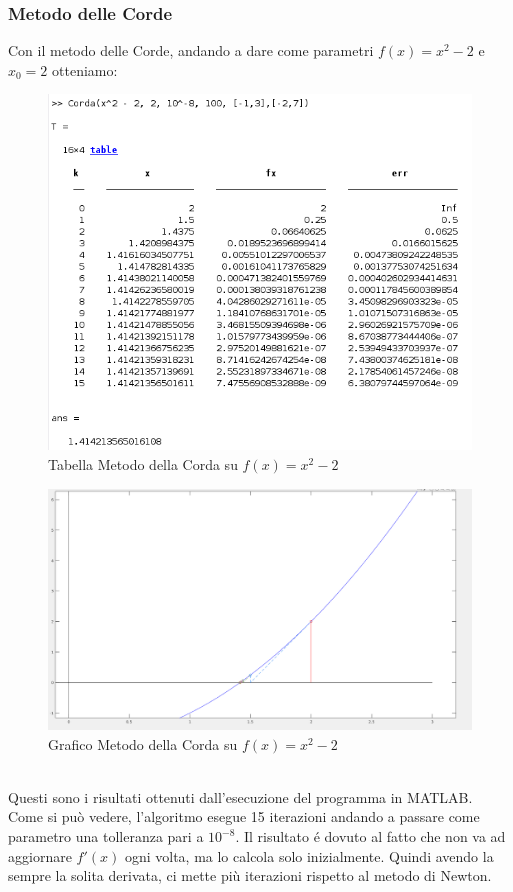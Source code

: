 \documentclass[12pt, letterpaper]{article}
\begin{document}
\subsubsection{Metodo delle Corde}
Con il metodo delle Corde, andando a dare come parametri $f(x)=x^2-2$ e $x_0=2$ otteniamo:
\begin{figure}[ht!]
    \includegraphics[scale=0.63]{TabellaParabolaCorda.png}
    \caption{Tabella Metodo della Corda su $f(x)=x^2-2$}
\end{figure}
\begin{figure}[ht!]
    \includegraphics[scale=0.5]{ParabolaChord.png}
    \caption{Grafico Metodo della Corda su $f(x)=x^2-2$}
\end{figure} \\

Questi sono i risultati ottenuti dall'esecuzione del programma in MATLAB.\\ Come si può vedere, l'algoritmo esegue 15 iterazioni andando a passare come parametro una tolleranza pari a $10^{-8}$.
Il risultato \'e dovuto al fatto che non va ad aggiornare $f'(x)$ ogni volta, ma lo calcola solo inizialmente. Quindi avendo la sempre la solita derivata, ci mette più iterazioni rispetto al metodo di Newton.
\end{document}

